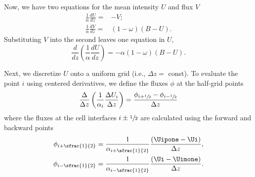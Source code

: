 Now, we have two equations for the mean intensity $U$ and flux $V$
\begin{align}
    \frac{1}{\alpha}\frac{dU}{dz} =& -V; \label{eqn:dUdz} \\
    \frac{1}{\alpha}\frac{dV}{dz} =& (1-\omega)(B-U). \label{eqn:dVdz}
\end{align}
Substituting $V$ into the second leaves one equation in $U$,
\begin{equation}\label{eqn:ddU/ddz}
    \frac{d}{dz} \left( \frac{1}{\alpha} \frac{dU}{dz} \right) = -\alpha(1-\omega)(B-U).
\end{equation}

Next, we discretize $U$ onto a uniform grid (i.e., $\Delta z =$ const). To evaluate the point $i$ using centered derivatives, we define the fluxes $\phi$ at the half-grid points
\begin{equation}\label{eqn:U_i-discrete}
    \frac{\Delta}{\Delta z} \left( \frac{1}{\alpha_i}\frac{\Delta U_i}{\Delta z} \right) = \frac{\phi_{i+\sfrac{1}{2}} - \phi_{i-\sfrac{1}{2}}}{\Delta z}
\end{equation}
where the fluxes at the cell interfaces $i\pm\sfrac{1}{2}$ are calculated using the forward and backward points
\begin{eqnarray}
    \phi_{i+\sfrac{1}{2}} = \frac{1}{\alpha_{i+\sfrac{1}{2}}} \frac{(\Uipone - \Ui)}{\Delta z}, \\
    \phi_{i-\sfrac{1}{2}} = \frac{1}{\alpha_{i-\sfrac{1}{2}}} \frac{(\Ui - \Uimone)}{\Delta z}.
\end{eqnarray}

